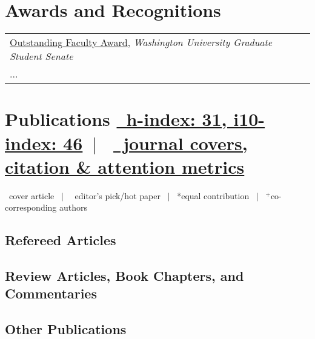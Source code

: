 \documentclass[letter,11pt]{article}
\begin{document}

\section{Awards and Recognitions}
\begin{tabularx}{\linewidth}{ >{\raggedright\arraybackslash}l 
>{\raggedleft\arraybackslash}X}	
\href{https://lewlab.wustl.edu/files/OFSA-Program-2023.pdf}{Outstanding Faculty Award}, \textit{Washington University Graduate Student Senate} & 2023 \\
... \\
\end{tabularx}

\section[Publications]{Publications \small{ \href{https://scholar.google.com/citations?user=8Kk2MugAAAAJ}{\faGoogleScholar \ h-index: 31, i10-index: 46}}\ $|$ \ \href{https://lewlab.wustl.edu/pages/publications.html}{\faGlobe \ journal covers, citation \& attention metrics}}
\faImage \ cover article \ $|$ \ \faStar \ editor’s pick/hot paper \ $|$ \ *equal contribution \ $|$ \ $^+$co-corresponding authors

\subsection{Refereed Articles}
\begin{refsection}
\nocite{*}
\printbibliography[heading=none, locallabelwidth=true]
\end{refsection}

\subsection{Review Articles, Book Chapters, and Commentaries}
\begin{refsection}
\nocite{*}
\printbibliography[heading=none, locallabelwidth=true]
\end{refsection}

\subsection{Other Publications}
\begin{refsection}
\nocite{*}
\printbibliography[heading=none, locallabelwidth=true]
\end{refsection}
\end{document}
